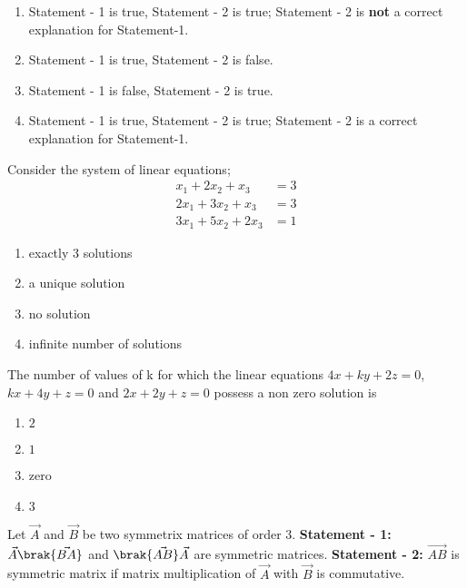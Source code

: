 	\hfill{}
	\begin{enumerate}
		\item Statement - 1 is true, Statement - 2 is true; Statement - 2 is \textbf{not} a correct explanation for Statement-1. 
	    	\item Statement - 1 is true, Statement - 2 is false. 
	    	\item Statement - 1 is false, Statement - 2 is true.
	    	\item Statement - 1 is true, Statement - 2 is true; Statement - 2 is a correct explanation for Statement-1. 
	\end{enumerate}

    \item Consider the system of linear equations;
	\begin{align*}
		x_1 + 2x_2 + x_3 &= 3\\
		2x_1 + 3x_2 + x_3 &= 3\\
		3x_1 + 5x_2 + 2x_3 &= 1
	\end{align*}
	\hfill{}{\par}
	\begin{enumerate}
		\item exactly $3$ solutions
	    	\item a unique solution
	    	\item no solution
	    	\item infinite number of solutions
	\end{enumerate}

    \item The number of values of k for which the linear equations $4x + ky + 2z = 0$, $kx + 4y + z = 0$ and $2x + 2y + z=0$ possess a non zero solution is 
	\hfill {}{\par}
        \begin{enumerate}
                \item $2$
                \item $1$
                \item zero
                \item $3$
        \end{enumerate}

    \item Let $\vec{A}$ and $\vec{B}$ be two symmetrix matrices of order $3$.
	\newline
	\textbf{Statement - 1:} $\vec{A}\brak{\vec{BA}}$ and $\brak{\vec{AB}}\vec{A}$ are symmetric matrices. 
	\newline
	\textbf{Statement - 2:} $\vec{AB}$ is symmetric matrix if matrix multiplication of $\vec{A}$ with $\vec{B}$ is commutative.


